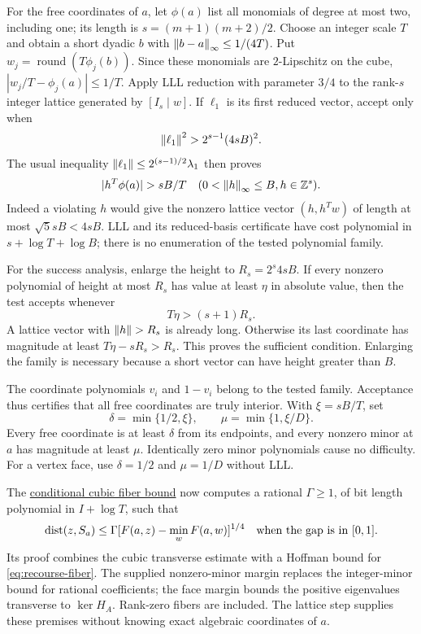 For the free coordinates of $a$, let $\phi(a)$ list all monomials of
degree at most two, including one; its length is
$s=(m+1)(m+2)/2$. Choose an integer scale $T$ and obtain a short dyadic
$b$ with $\left\lVert b-a\right\rVert_\infty\le1/(4T)$. Put
$w_j=\operatorname{round}(T\phi_j(b))$. Since these monomials are
$2$-Lipschitz on the cube,
$|w_j/T-\phi_j(a)|\le1/T$.
Apply LLL reduction with parameter $3/4$
\citep{LenstraLenstraLovasz1982} to the rank-$s$
integer lattice generated by $[I_s\mid w]$. If $\ell_1$ is its first
reduced vector, accept only when
\begin{equation}
 \left\lVert\ell_1\right\rVert^2>2^{s-1}(4sB)^2.
 \label{eq:recourse-lattice-test}
\end{equation}
The usual inequality
$\left\lVert\ell_1\right\rVert\le2^{(s-1)/2}\lambda_1$ then proves
\begin{equation}
 |h^T\phi(a)|>sB/T
 \quad(0<\norm{h}_\infty\le B, h\in\Z^s).
 \label{eq:recourse-all-margins}
\end{equation}
Indeed a violating $h$ would give the nonzero lattice vector
$(h,h^Tw)$ of length at most $\sqrt5sB<4sB$. LLL and its reduced-basis
certificate have cost polynomial in $s+\log T+\log B$; there is no
enumeration of the tested polynomial family.

For the success analysis, enlarge the height to $R_s=2^s4sB$.
If every nonzero polynomial of height at most $R_s$ has value at least
$\eta$ in absolute value, then the test accepts whenever
\begin{equation}
 T\eta>(s+1)R_s.
 \label{eq:recourse-lattice-success}
\end{equation}
A lattice vector with $\left\lVert h\right\rVert>R_s$ is already long. Otherwise its
last coordinate has magnitude at least
$T\eta-sR_s>R_s$. This proves the sufficient condition. Enlarging
the family is necessary because a short vector can have height greater
than $B$.

The coordinate polynomials $v_i$ and $1-v_i$ belong to the tested
family. Acceptance thus certifies that all free coordinates are truly
interior. With $\xi=sB/T$, set
\[
 \delta=\min\{1/2,\xi\},\qquad
 \mu=\min\{1,\xi/D\}.
\]
Every free coordinate is at least $\delta$ from its endpoints, and
every nonzero minor at $a$ has magnitude at least $\mu$.
Identically zero minor polynomials cause no difficulty. For a vertex
face, use $\delta=1/2$ and $\mu=1/D$ without LLL.

The
\href{../../research-20261002/new-direction/residual-convex-cubic-boundary.md}{conditional cubic fiber bound}
now computes a rational $\Gamma\ge1$, of bit length polynomial in
$I+\log T$, such that
\begin{equation}
 \operatorname{dist}(z,S_a)\le\Gamma
       [F(a,z)-\min_w F(a,w)]^{1/4}
 \quad\text{when the gap is in }[0,1].
 \label{eq:recourse-fiber-error}
\end{equation}
Its proof combines the cubic transverse estimate with a Hoffman bound
for \eqref{eq:recourse-fiber}. The supplied nonzero-minor margin
replaces the integer-minor bound for rational coefficients; the face
margin bounds the positive eigenvalues transverse to $\ker H_A$.
Rank-zero fibers are included. The lattice step supplies these premises
without knowing exact algebraic coordinates of $a$.

